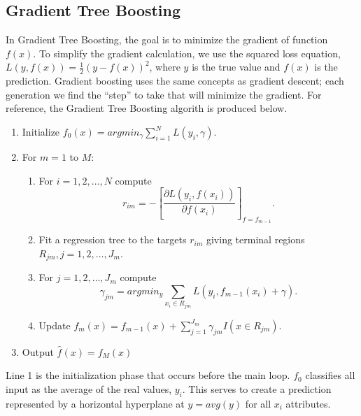 \documentclass[letterpaper]{article} %
\begin{document}
\subsection{Gradient Tree Boosting}
In Gradient Tree Boosting, the goal is to minimize the gradient of function
$f(x)$.
To simplify the gradient calculation, we use the squared loss equation,
$L(y,f(x)) = \frac{1}{2}(y - f(x))^2$,
where $y$ is the true value and $f(x)$ is the prediction.
Gradient boosting uses the same concepts as gradient descent;
each generation we find the ``step'' to take that will minimize the gradient.
For reference, the Gradient Tree Boosting algorith is produced below.
\bigskip
\begin{adjustwidth}{1em}{1em}
\begin{enumerate}
\item Initialize $f_0(x) = argmin_{\gamma}\sum_{i=1}^NL(y_i,\gamma)$.
\item For $m = 1$ to $M$:
\begin{adjustwidth}{1em}{0em}
\begin{enumerate}
\item For $i = 1,2,\dots,N$ compute
$$
r_{im} =
-\left[
\frac{\partial L(y_i,f(x_i))}{\partial f(x_i)}
\right]_{f=f_{m - 1}} \text{.}
$$
\item Fit a regression tree to the targets $r_{im}$ giving terminal regions
$R_{jm}, j = 1,2,\dots,J_m$.
\item For $j = 1,2,\dots,J_m$ compute
$$
\gamma_{jm} = argmin_{y}\sum_{x_i\in R_{jm}}L(y_i,f_{m - 1}(x_i) + \gamma) \text{.}
$$
\item Update $f_m(x) = f_{m - 1}(x) + \sum_{j=1}^{J_m}\gamma_{jm}I(x\in R_{jm})$.
\end{enumerate}
\end{adjustwidth}
\item Output $\hat{f}(x) = f_M(x)$
\end{enumerate}
\end{adjustwidth}
\bigskip

Line 1 is the initialization phase that occurs before the main loop.
$f_0$ classifies all input as the average of the real values, $y_i$.
This serves to create a prediction represented by a horizontal
hyperplane at $y = avg(y)$ for all $x_i$ attributes.
\end{document}
